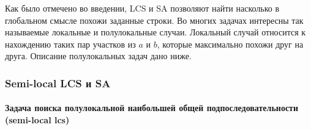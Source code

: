 Как было отмечено во введении, LCS  и SA позволяют найти насколько в глобальном смысле похожи заданные строки.
Во многих задачах интересны так называемые локальные и полулокальные случаи.
Локальный случай относится к нахождению таких пар участков из $a$ и $b$, которые максимально похожи друг на друга.
Описание полулокальных задач дано ниже.


\subsubsection{Semi-local LCS и SA}

\paragraph*{Задача поиска полулокальной наибольшей общей подпоследовательности (semi-local lcs)}\mbox{}

